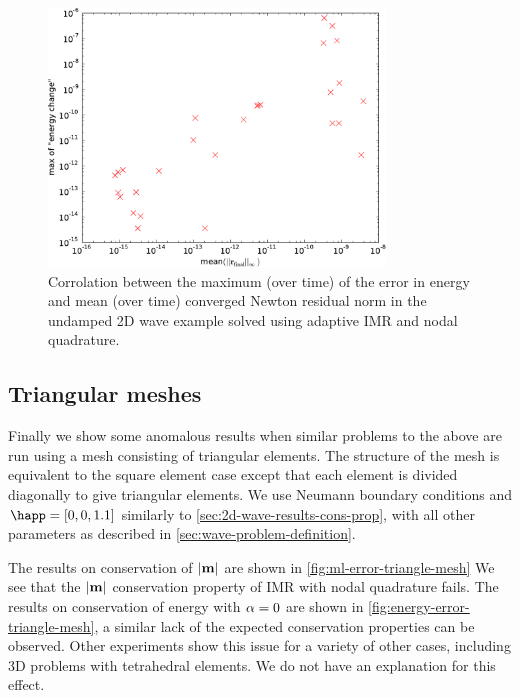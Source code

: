 \begin{figure}
  \centering
  \includegraphics[width=0.8\textwidth]
  {plots/2d_wave_solution_energy_newton_res/maxofenergychangevsmeanminofnewtonresiduals.pdf}
  \caption{Corrolation between the maximum (over time) of the error in energy and mean (over time) converged Newton residual norm in the undamped 2D wave example solved using adaptive IMR and nodal quadrature.}
  \label{fig:energy-error-2d-nodal-newton-tests}
\end{figure}


\subsection{Triangular meshes}

Finally we show some anomalous results when similar problems to the above are run using a mesh consisting of triangular elements.
The structure of the mesh is equivalent to the square element case except that each element is divided diagonally to give triangular elements.
We use Neumann boundary conditions and $\happ = [0, 0, 1.1]$ similarly to \cref{sec:2d-wave-results-cons-prop}, with all other parameters as described in \cref{sec:wave-problem-definition}.

The results on conservation of $\left|{\boldsymbol{\mathrm{m}}} \right|$ are shown in \cref{fig:ml-error-triangle-mesh}
We see that the $\left|{\boldsymbol{\mathrm{m}}} \right|$ conservation property of IMR with nodal quadrature fails.
The results on conservation of energy with $\alpha = 0$ are shown in \cref{fig:energy-error-triangle-mesh}, a similar lack of the expected conservation properties can be observed.
Other experiments show this issue for a variety of other cases, including 3D problems with tetrahedral elements.
We do not have an explanation for this effect.


